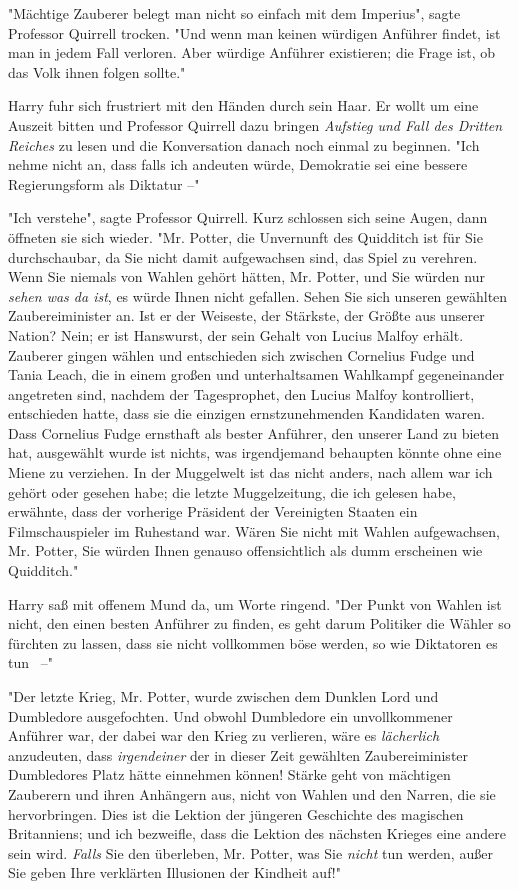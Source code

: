 {"Mächtige Zauberer belegt man nicht so einfach mit dem Imperius", sagte Professor Quirrell trocken. "Und wenn man keinen würdigen Anführer findet, ist man in jedem Fall verloren. Aber würdige Anführer existieren; die Frage ist, ob das Volk ihnen folgen sollte."

Harry fuhr sich frustriert mit den Händen durch sein Haar. Er wollt um eine Auszeit bitten und Professor Quirrell dazu bringen \emph{Aufstieg und Fall des Dritten Reiches} zu lesen und die Konversation danach noch einmal zu beginnen. "Ich nehme nicht an, dass falls ich andeuten würde, Demokratie sei eine bessere Regierungsform als Diktatur --"

"Ich verstehe", sagte Professor Quirrell. Kurz schlossen sich seine Augen, dann öffneten sie sich wieder. "Mr. Potter, die Unvernunft des Quidditch ist für Sie durchschaubar, da Sie nicht damit aufgewachsen sind, das Spiel zu verehren. Wenn Sie niemals von Wahlen gehört hätten, Mr. Potter, und Sie würden nur \emph{sehen was da ist}, es würde Ihnen nicht gefallen. Sehen Sie sich unseren gewählten Zaubereiminister an. Ist er der Weiseste, der Stärkste, der Größte aus unserer Nation? Nein; er ist Hanswurst, der sein Gehalt von Lucius Malfoy erhält. Zauberer gingen wählen und entschieden sich zwischen Cornelius Fudge und Tania Leach, die in einem großen und unterhaltsamen Wahlkampf gegeneinander angetreten sind, nachdem der Tagesprophet, den Lucius Malfoy kontrolliert, entschieden hatte, dass sie die einzigen ernstzunehmenden Kandidaten waren. Dass Cornelius Fudge ernsthaft als bester Anführer, den unserer Land zu bieten hat, ausgewählt wurde ist nichts, was irgendjemand behaupten könnte ohne eine Miene zu verziehen. In der Muggelwelt ist das nicht anders, nach allem war ich gehört oder gesehen habe; die letzte Muggelzeitung, die ich gelesen habe, erwähnte, dass der vorherige Präsident der Vereinigten Staaten ein Filmschauspieler im Ruhestand war. Wären Sie nicht mit Wahlen aufgewachsen, Mr. Potter, Sie würden Ihnen genauso offensichtlich als dumm erscheinen wie Quidditch."

Harry saß mit offenem Mund da, um Worte ringend. "Der Punkt von Wahlen ist nicht, den einen besten Anführer zu finden, es geht darum Politiker die Wähler so fürchten zu lassen, dass sie nicht vollkommen böse werden, so wie Diktatoren es tun ~--"

"Der letzte Krieg, Mr. Potter, wurde zwischen dem Dunklen Lord und Dumbledore ausgefochten. Und obwohl Dumbledore ein unvollkommener Anführer war, der dabei war den Krieg zu verlieren, wäre es \emph{lächerlich} anzudeuten, dass \emph{irgendeiner} der in dieser Zeit gewählten Zaubereiminister Dumbledores Platz hätte einnehmen können! Stärke geht von mächtigen Zauberern und ihren Anhängern aus, nicht von Wahlen und den Narren, die sie hervorbringen. Dies ist die Lektion der jüngeren Geschichte des magischen Britanniens; und ich bezweifle, dass die Lektion des nächsten Krieges eine andere sein wird. \emph{Falls} Sie den überleben, Mr. Potter, was Sie \emph{nicht} tun werden, außer Sie geben Ihre verklärten Illusionen der Kindheit auf!"

}
